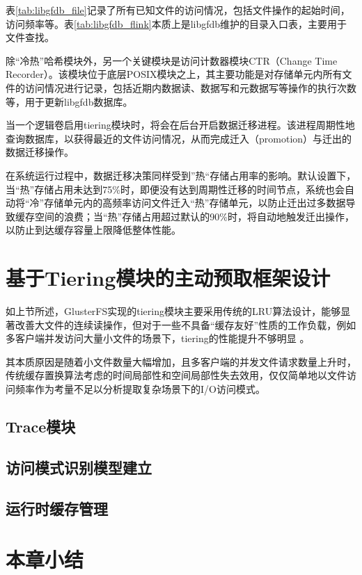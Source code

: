 表\ref{tab:libgfdb_file}记录了所有已知文件的访问情况，包括文件操作的起始时间，访问频率等。表\ref{tab:libgfdb_flink}本质上是libgfdb维护的目录入口表，主要用于文件查找。

除“冷热”哈希模块外，另一个关键模块是访问计数器模块CTR（Change Time Recorder）。该模块位于底层POSIX模块之上，其主要功能是对存储单元内所有文件的访问情况进行记录，包括近期内数据读、数据写和元数据写等操作的执行次数等，用于更新libgfdb数据库。

当一个逻辑卷启用tiering模块时，将会在后台开启数据迁移进程。该进程周期性地查询数据库，以获得最近的文件访问情况，从而完成{\color{orange}迁入}（promotion）与{\color{orange}迁出}的数据迁移操作。

在系统运行过程中，数据迁移决策同样受到”热“存储占用率的影响。默认设置下，当“热”存储占用未达到75\%时，即便没有达到周期性迁移的时间节点，系统也会自动将“冷”存储单元内的高频率访问文件迁入“热”存储单元，以防止迁出过多数据导致缓存空间的浪费；当“热”存储占用超过默认的90\%时，将自动地触发迁出操作，以防止到达缓存容量上限降低整体性能。

\section{基于Tiering模块的主动预取框架设计}
如上节所述，GlusterFS实现的tiering模块主要采用传统的LRU算法设计，能够显著改善大文件的连续读操作，但对于一些不具备“缓存友好”性质的工作负载，例如多客户端并发访问大量小文件的场景下，tiering的性能提升不够明显
\cite{Red_Hat_Gluster_storage_on_supermicro_storage_servers_powered_by_Intel_Xeon_processors}。

其本质原因是随着小文件数量大幅增加，且多客户端的并发文件请求数量上升时，传统缓存置换算法考虑的时间局部性和空间局部性失去效用，仅仅简单地以文件访问频率作为考量不足以分析提取复杂场景下的I/O访问模式。

\subsection{Trace模块}
\subsection{访问模式识别模型建立}
\subsection{运行时缓存管理}


\section{本章小结}